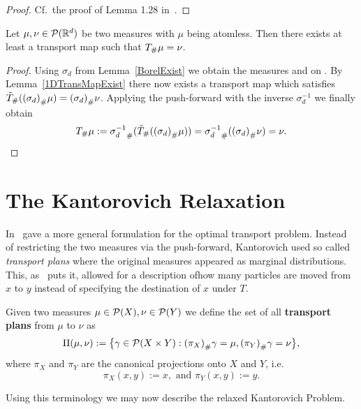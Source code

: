 \begin{proof}
	Cf.~the proof of Lemma 1.28 in~\cite{San2015}.
\end{proof}

\begin{corollary}\label{NDTransMapExist}
	Let $\mu, \nu \in \PM{\R^d}$ be two measures with $\mu$ being atomless. Then there exists at least a transport map  such that $\push{\mu} = \nu$.
\end{corollary}

\begin{proof}
	Using $\sigma_d$ from Lemma~\ref{BorelExist} we obtain the measures \push[(\sigma_d)]{\mu} and \push[(\sigma_d)]{\nu} on \R. By Lemma~\ref{1DTransMapExist} there now exists a transport map \map[\tilde{T}]{\R}{\R} which satisfies $\push[\tilde{T}]{(\push[(\sigma_d)]{\mu})} = \push[(\sigma_d)]{\nu}$. Applying the push-forward with the inverse $\sigma_d^{-1}$ we finally obtain
	\[ \push{\mu} := \push[\sigma_d^{-1}]{(\push[\tilde{T}]{(\push[(\sigma_d)]{\mu})})} = \push[\sigma_d^{-1}]{(\push[(\sigma_d)]{\nu})} = \nu. \]
\end{proof}

\section{The Kantorovich Relaxation}\label{KantRelax}
In~\cite{Kan1942} gave a more general formulation for the optimal transport problem. Instead of restricting the two measures via the push-forward, Kantorovich used so called \textit{transport plans} where the original measures appeared as marginal distributions. This, as~\cite{San2015} puts it,  allowed for a description ofhow many particles are moved from $x$ to $y$ instead of specifying the destination of $x$ under $T$.

\begin{definition}\label{TransPlans}
	Given two measures $\mu \in \PM{X}, \nu \in \PM{Y}$ we define the set of all \textbf{transport plans} from $\mu$ to $\nu$ as
	\[ \TP{\mu}{\nu} := \big\{ \gamma \in \PM{X \times Y} : \push[(\pi_X)]{\gamma} = \mu, \push[(\pi_Y)]{\gamma} = \nu \big\}, \]
	where $\pi_X$ and $\pi_Y$ are the canonical projections onto $X$ and $Y$, i.e.
	\[ \pi_X(x, y) := x, \text{ and } \pi_Y(x, y) := y. \]
\end{definition}

Using this terminology we may now describe the relaxed Kantorovich Problem.

